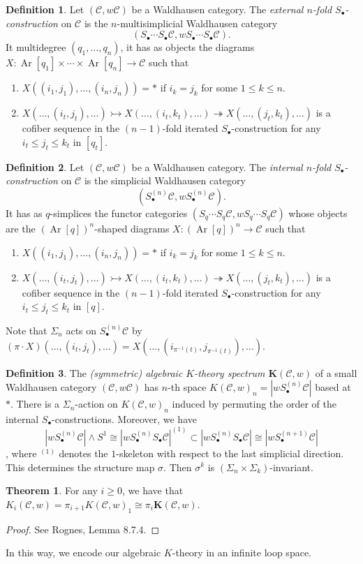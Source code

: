 \documentclass[10pt,letterpaper,cm]{nupset}
\theoremstyle{definition}
\newtheorem{definition}{Definition}
\theoremstyle{theorem}
\newtheorem{theorem}{Theorem}
\theoremstyle{remark}
\newcommand{\1}{\mathbf{1}}
\renewcommand{\c}{\mathscr{C}}
\newcommand{\0}{\vec 0}
\DeclareMathOperator{\Ar}{Ar}
\begin{document}
\begin{definition}
Let $(\c, w\c)$ be a Waldhausen category. The \textit{external $n$-fold $S_{\bullet}$-construction} on $\c$ is the $n$-multisimplicial Waldhausen category $$(S_{\bullet}\cdots S_{\bullet}\c, wS_{\bullet} \cdots S_{\bullet} \c).$$ It multidegree $(q_1, \ldots, q_n)$, it has as objects the diagrams  $X: \Ar[q_1] \times \cdots \times \Ar[q_n] \to \c$ such that
\begin{enumerate}
\item $X((i_1, j_1), \ldots, (i_n, j_n)) = \ast$ if $i_k = j_k$ for some $1\leq k \leq n$.
\item $X(\ldots, (i_t, j_t), \ldots) \rightarrowtail X(\ldots, (i_t, k_t), \ldots) \twoheadrightarrow X(\ldots, (j_t, k_t), \ldots)$ is a cofiber sequence  in the $(n-1)$-fold iterated $S_{\bullet}$-construction for any $i_t \leq j_t \leq k_t$ in $[q_t]$.
\end{enumerate}
\end{definition}

\begin{definition}
Let $(\c, w\c)$ be a Waldhausen category. The \textit{internal $n$-fold $S_{\bullet}$-construction} on $\c$ is the simplicial Waldhausen category $$(S_{\bullet}^{(n)}\c, wS_{\bullet}^{(n)} \c).$$ It has as $q$-simplices the functor categories $(S_q \cdots S_q \c, wS_q \cdots S_q \c)$ whose objects are the $(\Ar[q])^n$-shaped diagrams  $X: (\Ar[q])^n\to \c$ such that
\begin{enumerate}
\item $X((i_1, j_1), \ldots, (i_n, j_n)) = \ast$ if $i_k = j_k$ for some $1\leq k \leq n$.
\item $X(\ldots, (i_t, j_t), \ldots) \rightarrowtail X(\ldots, (i_t, k_t), \ldots) \twoheadrightarrow X(\ldots, (j_t, k_t), \ldots)$ is a cofiber sequence  in the $(n-1)$-fold iterated $S_{\bullet}$-construction for any $i_t \leq j_t \leq k_t$ in $[q]$.
\end{enumerate}
Note that $\Sigma_n$ acts on $S_{\bullet}^{(n)}\c$ by $(\pi \cdot X)(\ldots, (i_t, j_t), \ldots) = X(\ldots, (i_{\pi^{{-}1}(t)}, j_{\pi^{{-}1}(t)}), \ldots)$.
\end{definition}

\begin{definition}
The \textit{(symmetric) algebraic $K$-theory  spectrum $\mathbf{K}(\c, w)$} of a small Waldhausen category $(\c, w\c)$ has $n$-th space $K(\c, w)_n = |wS_{\bullet}^{(n)}\c|$ based at $\ast$. There is a $\Sigma_n$-action on $K(\c, w)_n$ induced by permuting the order of the internal $S_{\bullet}$-constructions. Moreover, we have $$|wS_{\bullet}^{(n)}\c| \land S^1 \cong |wS_{\bullet}^{(n)}S_{\bullet}\c|^{(1)} \subset |wS_{\bullet}^{(n)}S_{\bullet}\c| \cong |wS_{\bullet}^{(n+1)}\c|$$, where $^{(1)}$ denotes the $1$-skeleton with respect to the last simplicial direction. This determines the structure map $\sigma$. Then $\sigma^k$ is $(\Sigma_{n} \times \Sigma_{k})$-invariant.
\end{definition}


\begin{theorem}
For any $i\geq 0$, we have that $K_i(\c, w) = \pi_{i+1}K(\c, w)_1 \cong \pi_i \mathbf{K}(\c, w)$.
\end{theorem}
\begin{proof}
See Rognes, Lemma 8.7.4.
\end{proof}


In this way, we encode our algebraic $K$-theory in an infinite loop space.
\end{document}
